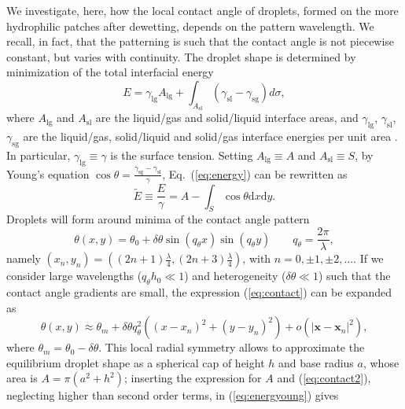 \noindent We investigate, here, how the local contact angle of droplets, formed on the more hydrophilic patches after dewetting, depends on the pattern wavelength. 
We recall, in fact, that the patterning is such that the contact angle is not piecewise constant, but varies with continuity.
The droplet shape is determined by minimization of the total interfacial energy
\begin{equation}\label{eq:energy}
  E = \gamma_{\text{lg}} A_{\text{lg}} + \int_{A_{\text{sl}}} (\gamma_{\text{sl}} - \gamma_{\text{sg}})d \sigma,
\end{equation}
where $A_{\text{lg}}$ and $A_{\text{sl}}$ are the liquid/gas and solid/liquid interface areas, and $\gamma_{\text{lg}}$, $\gamma_{\text{sl}}$, $\gamma_{\text{sg}}$ are the liquid/gas, solid/liquid and solid/gas interface energies per unit area \cite{wuHowChemicalPatterns2020}. 
In particular, $\gamma_{\text{lg}} \equiv \gamma$ is the surface tension.
Setting $A_{\text{lg}} \equiv A$ and $A_{\text{sl}} \equiv S$, by Young's equation $\cos \theta = \frac{\gamma_{\text{sg}} - \gamma_{\text{sl}}}{\gamma}$, Eq.~(\ref{eq:energy}) can be rewritten as
\begin{equation}\label{eq:energyoung}
  \tilde{E} \equiv \frac{E}{\gamma} = A - \int_S \cos \theta \text{d}x \text{d}y.
\end{equation}
Droplets will form around minima of the contact angle pattern
\begin{equation}\label{eq:contact}
  \theta(x,y) = \theta_0 + \delta \theta \sin(q_{\theta} x) \sin (q_{\theta} y) \qquad q_{\theta} = \frac{2\pi}{\lambda},
\end{equation}
namely $(x_n,y_n) = \left((2n+1)\frac{\lambda}{4},(2n+3)\frac{\lambda}{4}\right)$, with $n=0,\pm 1, \pm 2,\dots$.
If we consider large wavelengths ($q_{\theta} h_0 \ll 1$) and heterogeneity ($\delta \theta \ll 1$) such that the contact angle gradients are small, the
expression (\ref{eq:contact}) can be expanded as
\begin{equation}\label{eq:contact2}
  \theta(x,y) \approx \theta_m + \delta \theta q_{\theta}^2 ((x-x_n)^2 + (y - y_n)^2) + o(|\mathbf{x}-\mathbf{x}_n|^2),
\end{equation}
where $\theta_m = \theta_0 - \delta \theta$.
This local radial symmetry allows to approximate the equilibrium droplet shape as a spherical cap of height $h$ and base radius $a$, whose area is $A = \pi(a^2 + h^2)$; inserting the expression for $A$ and (\ref{eq:contact2}), neglecting higher than second order terms, in (\ref{eq:energyoung}) gives
